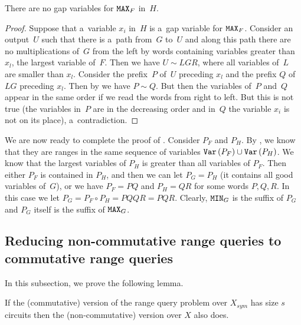 \documentclass{toc}
\begin{document}
\begin{claim}\label{cl: f is good}
    There are no gap variables for $\texttt{MAX}_F$ in~$H$.
\end{claim}

\begin{proof}
    Suppose that a~variable $x_i$ in~$H$ is a~gap variable for $\texttt{MAX}_F$. Consider an output~$U$ such that there is a~path from~$G$ to~$U$ and along this path there are no multiplications of~$G$ from the left by words containing variables greater than $x_l$, the largest variable of~$F$. Then we have $U \sim LGR$, where all variables of~$L$ are smaller than $x_l$. Consider the prefix~$P$ of~$U$ preceding $x_l$ and the prefix $Q$ of $LG$ preceding $x_l$.
    Then by  we have $P \sim Q$. But then the variables of~$P$ and~$Q$ appear in the same order if we read the words from right to left. But this is not true (the variables in~$P$ are in the decreasing order and in~$Q$ the variable $x_i$ is not on its place), a~contradiction.
\end{proof}

We are now ready to complete the proof of .
Consider $P_F$ and $P_H$. By  , we know that they are ranges in the same sequence of variables $\texttt{Var}\,(P_F)\cup \texttt{Var}\,(P_H)$. We know that the largest variables of $P_H$ is greater than all variables of $P_F$. Then either $P_F$ is contained in $P_H$, and then we can let $P_G=P_H$ (it contains all good variables of~$G$), or we have $P_F =PQ$ and $P_H=QR$ for some words $P, Q, R$. In this case we let $P_G = P_F \circ P_H = PQQR=PQR$. Clearly, $\texttt{MIN}_G$ is the suffix of $P_G$ and $P_G$ itself is the suffix of $\texttt{MAX}_G$.



\subsection{Reducing non-commutative range queries to commutative range queries} \label{sec:non-commutative_to_commutative}

In this subsection, we prove the following lemma.

\begin{lemma} \label{lem:intervals}
    If the (commutative) version of the 
    range query
    problem over $X_{sym}$ has
    size $s$ circuits then the (non-commutative) version over $X$ also does.
\end{lemma}
\end{document}
